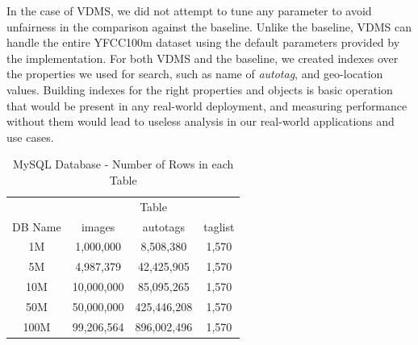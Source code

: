 In the case of VDMS, we did not attempt to tune any
parameter to avoid unfairness in the comparison against the baseline.
Unlike the baseline, VDMS can handle the entire YFCC100m dataset using the default parameters provided by the implementation.
For both VDMS and the baseline, we created indexes over the
properties we used for search, such as name of
\textit{autotag}, and geo-location values.
Building indexes for the right properties and objects
is basic operation that would be present in any real-world deployment,
and measuring performance without them would lead to useless analysis in our
real-world applications and use cases.

\begin{table}[ht]
\caption{MySQL Database - Number of Rows in each Table}
\centering
\begin{tabular}{c c c c}
\hline\hline
 & \multicolumn{3}{c}{Table}\\
\cline{2-4}
DB Name & images & autotags & taglist\\
\hline
1M   & 1,000,000  & 8,508,380   & 1,570\\
5M   & 4,987,379  & 42,425,905  & 1,570\\
10M  & 10,000,000 & 85,095,265  & 1,570\\
50M  & 50,000,000 & 425,446,208 & 1,570\\
100M & 99,206,564 & 896,002,496 & 1,570\\
\hline
\end{tabular}
\label{table:mysqltables}
\end{table}

